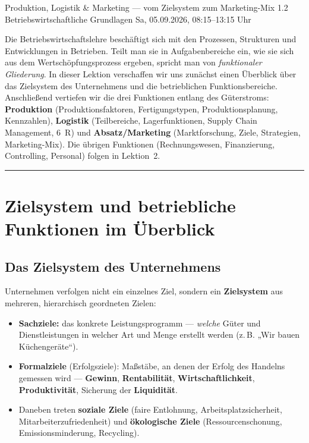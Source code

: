\documentclass[11pt, a4paper]{article}
\begin{document}
%
  {Produktion, Logistik \& Marketing --- vom Zielsystem zum Marketing-Mix}%
  {1.2 Betriebswirtschaftliche Grundlagen}%
  {Sa, 05.09.2026, 08:15--13:15 Uhr}

\begin{merksatz}[title={\bfseries Worum geht es in dieser Lektion?}]
Die Betriebswirtschaftslehre beschäftigt sich mit den Prozessen, Strukturen und
Entwicklungen in Betrieben. Teilt man sie in Aufgabenbereiche ein, wie sie sich aus dem
Wertschöpfungsprozess ergeben, spricht man von \emph{funktionaler Gliederung}. In dieser
Lektion verschaffen wir uns zunächst einen Überblick über das Zielsystem des Unternehmens
und die betrieblichen Funktionsbereiche. Anschließend vertiefen wir die drei Funktionen
entlang des Güterstroms: \textbf{Produktion} (Produktionsfaktoren, Fertigungstypen,
Produktionsplanung, Kennzahlen), \textbf{Logistik} (Teilbereiche, Lagerfunktionen, Supply
Chain Management, 6~R) und \textbf{Absatz/Marketing} (Marktforschung, Ziele, Strategien,
Marketing-Mix). Die übrigen Funktionen (Rechnungswesen, Finanzierung, Controlling,
Personal) folgen in Lektion~2.
\end{merksatz}

\tableofcontents
\vspace{1em}
\hrule
\vspace{1em}

\section{Zielsystem und betriebliche Funktionen im Überblick}

\subsection{Das Zielsystem des Unternehmens}

Unternehmen verfolgen nicht ein einzelnes Ziel, sondern ein \textbf{Zielsystem} aus
mehreren, hierarchisch geordneten Zielen:

\begin{itemize}
  \item \textbf{Sachziele:} das konkrete Leistungsprogramm --- \emph{welche} Güter und
    Dienstleistungen in welcher Art und Menge erstellt werden (z.\,B. „Wir bauen
    Küchengeräte``).
  \item \textbf{Formalziele} (Erfolgsziele): Maßstäbe, an denen der Erfolg des Handelns
    gemessen wird --- \textbf{Gewinn}, \textbf{Rentabilität}, \textbf{Wirtschaftlichkeit},
    \textbf{Produktivität}, Sicherung der \textbf{Liquidität}.
  \item Daneben treten \textbf{soziale Ziele} (faire Entlohnung, Arbeitsplatzsicherheit,
    Mitarbeiterzufriedenheit) und \textbf{ökologische Ziele} (Ressourcenschonung,
    Emissionsminderung, Recycling).
\end{itemize}
\end{document}
